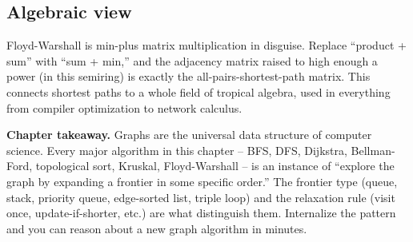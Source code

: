 \documentclass[11pt]{article}
\begin{document}
\subsection*{Algebraic view}

Floyd-Warshall is min-plus matrix multiplication in disguise. Replace ``product + sum'' with ``sum + min,'' and the adjacency matrix raised to high enough a power (in this semiring) is exactly the all-pairs-shortest-path matrix. This connects shortest paths to a whole field of tropical algebra, used in everything from compiler optimization to network calculus.

\begin{ideabox}
\textbf{Chapter takeaway.} Graphs are the universal data structure of computer science. Every major algorithm in this chapter -- BFS, DFS, Dijkstra, Bellman-Ford, topological sort, Kruskal, Floyd-Warshall -- is an instance of ``explore the graph by expanding a frontier in some specific order.'' The frontier type (queue, stack, priority queue, edge-sorted list, triple loop) and the relaxation rule (visit once, update-if-shorter, etc.) are what distinguish them. Internalize the pattern and you can reason about a new graph algorithm in minutes.
\end{ideabox}
\end{document}
